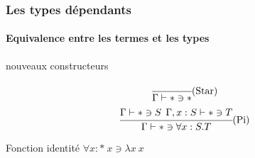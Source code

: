 \documentclass{beamer}
\newcommand{\Lam}[2]{\ensuremath{\lambda #1\: #2}}
\begin{document}
\begin{frame}
  \frametitle{Les types dépendants}
  \framesubtitle{Equivalence entre les termes et les types}

  \begin{block}{nouveaux constructeurs}
    \[
    \begin{array}{cc}
    \cfrac{}
          {\Gamma \vdash * \ni *}\mbox{(Star)} 
          \medskip
          \\          
    \cfrac{\Gamma \vdash * \ni S\:\:\Gamma,x:S \vdash *\ni T}
          {\Gamma\vdash * \ni \forall x:S.T}\mbox{(Pi)}
    \end{array}
          \]
  \end{block}


  \begin{block}{Fonction identité}
    $\forall x:*\: x \ni \Lam{x}{x}$
  \end{block}
  


\end{frame}
\end{document}
